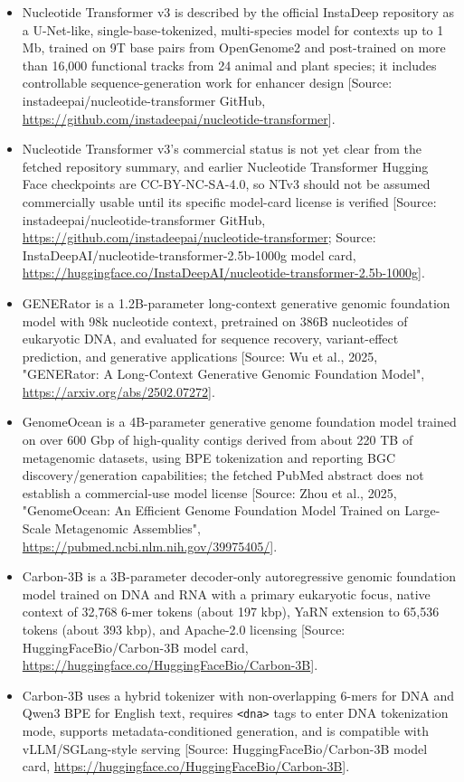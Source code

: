 \documentclass[11pt]{report}
\begin{document}
\begin{itemize}
\item Nucleotide Transformer v3 is described by the official InstaDeep repository as a U-Net-like, single-base-tokenized, multi-species model for contexts up to 1 Mb, trained on 9T base pairs from OpenGenome2 and post-trained on more than 16,000 functional tracks from 24 animal and plant species; it includes controllable sequence-generation work for enhancer design [Source: instadeepai/nucleotide-transformer GitHub, \url{https://github.com/instadeepai/nucleotide-transformer}].
\item Nucleotide Transformer v3's commercial status is not yet clear from the fetched repository summary, and earlier Nucleotide Transformer Hugging Face checkpoints are CC-BY-NC-SA-4.0, so NTv3 should not be assumed commercially usable until its specific model-card license is verified [Source: instadeepai/nucleotide-transformer GitHub, \url{https://github.com/instadeepai/nucleotide-transformer}; Source: InstaDeepAI/nucleotide-transformer-2.5b-1000g model card, \url{https://huggingface.co/InstaDeepAI/nucleotide-transformer-2.5b-1000g}].
\item GENERator is a 1.2B-parameter long-context generative genomic foundation model with 98k nucleotide context, pretrained on 386B nucleotides of eukaryotic DNA, and evaluated for sequence recovery, variant-effect prediction, and generative applications [Source: Wu et al., 2025, "GENERator: A Long-Context Generative Genomic Foundation Model", \url{https://arxiv.org/abs/2502.07272}].
\item GenomeOcean is a 4B-parameter generative genome foundation model trained on over 600 Gbp of high-quality contigs derived from about 220 TB of metagenomic datasets, using BPE tokenization and reporting BGC discovery/generation capabilities; the fetched PubMed abstract does not establish a commercial-use model license [Source: Zhou et al., 2025, "GenomeOcean: An Efficient Genome Foundation Model Trained on Large-Scale Metagenomic Assemblies", \url{https://pubmed.ncbi.nlm.nih.gov/39975405/}].
\item Carbon-3B is a 3B-parameter decoder-only autoregressive genomic foundation model trained on DNA and RNA with a primary eukaryotic focus, native context of 32,768 6-mer tokens (about 197 kbp), YaRN extension to 65,536 tokens (about 393 kbp), and Apache-2.0 licensing [Source: HuggingFaceBio/Carbon-3B model card, \url{https://huggingface.co/HuggingFaceBio/Carbon-3B}].
\item Carbon-3B uses a hybrid tokenizer with non-overlapping 6-mers for DNA and Qwen3 BPE for English text, requires \texttt{<dna>} tags to enter DNA tokenization mode, supports metadata-conditioned generation, and is compatible with vLLM/SGLang-style serving [Source: HuggingFaceBio/Carbon-3B model card, \url{https://huggingface.co/HuggingFaceBio/Carbon-3B}].

\end{itemize}
\end{document}
